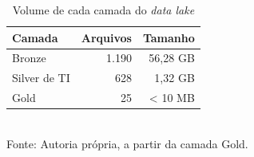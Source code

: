 \begin{table}[htbp]
    \centering
    \caption{Volume de cada camada do \textit{data lake}}
    \label{tab:volumes}
    \footnotesize
    \renewcommand{\arraystretch}{1.25}
    \begin{tabular}{lrr}
        \toprule
        \rowcolor{black!8}
        \textbf{Camada} & \textbf{Arquivos} & \textbf{Tamanho} \\
        \midrule
        Bronze & 1.190 & 56,28 GB \\
        Silver de TI & 628 & 1,32 GB \\
        Gold & 25 & < 10 MB \\
        \bottomrule
    \end{tabular}
    \\[4pt]
    Fonte: Autoria própria, a partir da camada Gold.
\end{table}
